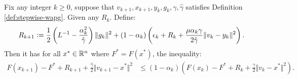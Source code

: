 \documentclass[12pt]{article}
\begin{document}
    \begin{proposition}\label{prop:stepwise-lyapunov}\;\\
        Fix any integer $k \ge0$, suppose that $v_{k + 1}, x_{k + 1}, y_k, g_k, \gamma, \hat \gamma$ satisfies Definition \ref{def:stepwise-wapg}. 
        Given any $R_k$.
        Define: 
        \begin{align*}
            R_{k + 1}
            \vcentcolon=
            \frac{1}{2}\left(
                L^{-1} - \frac{\alpha_k^2}{\hat \gamma}
            \right)\Vert g_k\Vert^2
            + 
            (1 - \alpha_k)
            \left(
                \epsilon_k + R_k + 
                \frac{\mu\alpha_k\gamma}{2\hat \gamma}
                \Vert v_k - y_k\Vert^2
            \right). 
        \end{align*}
        Then it has for all $x^* \in \mathbb R^n$ where $F^* = F(x^*)$, the inequality: 
        \begin{align*}
            F(x_{k + 1}) - F^* + R_{k + 1} + \frac{\hat \gamma}{2}\Vert v_{k + 1} - x^*\Vert^2
            &\le 
            (1 - \alpha_k)
            \left(
                F(x_k) - F^* + R_k + \frac{\gamma}{2}\Vert v_k - x^*\Vert^2
            \right). 
        \end{align*}
    \end{proposition}
\end{document}
